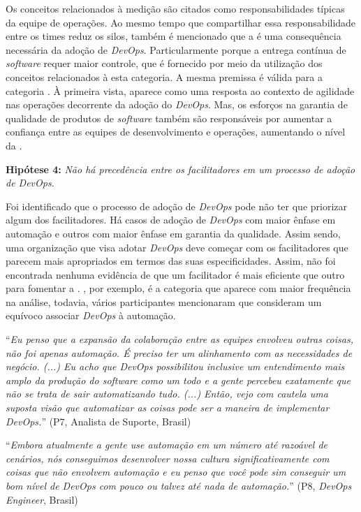 Os conceitos relacionados à medição são citados como responsabilidades típicas
da equipe de operações. Ao mesmo tempo que compartilhar essa responsabilidade
entre os times reduz os silos, também é mencionado que a 
é uma consequência necessária da adoção de {\it DevOps}. Particularmente porque a
entrega contínua de {\it software} requer maior controle, que é fornecido por
meio da utilização dos conceitos relacionados à esta categoria.
A mesma premissa é válida para a categoria .
À primeira vista,  aparece como uma resposta ao
contexto de agilidade nas operações decorrente da adoção do {\it DevOps}. Mas,
os esforços na garantia de qualidade de produtos de {\it software} também são
responsáveis por aumentar a confiança entre as equipes de desenvolvimento e
operações, aumentando o nível da \cc.

\begin{mh}
\textbf{Hipótese 4:} {\it Não há precedência entre os facilitadores em um
processo de adoção de DevOps}.
\end{mh}

Foi identificado que o processo de adoção de {\it DevOps} pode não ter que
priorizar algum dos facilitadores. Há casos de adoção de {\it DevOps} com maior
ênfase em automação e outros com maior ênfase em garantia da qualidade. Assim
sendo, uma organização que visa adotar {\it DevOps} deve começar com os
facilitadores que parecem mais apropriados em termos das suas especificidades.
Assim, não foi encontrada nenhuma evidência de que um facilitador é mais
eficiente que outro para fomentar a \cc. , por exemplo, é a
categoria que aparece com maior frequência na análise, todavia, vários
participantes mencionaram que consideram um equívoco associar {\it DevOps} à
automação.

\begin{mq}
``\emph{Eu penso que a expansão da colaboração entre as equipes envolveu outras
coisas, não foi apenas automação. É preciso ter um alinhamento com as
necessidades de negócio. (...) Eu acho que DevOps possibilitou inclusive um
entendimento mais amplo da produção do software como um todo e a gente percebeu
exatamente que não se trata de sair automatizando tudo. (...) Então, vejo com cautela uma
suposta visão que automatizar as coisas pode ser a maneira de implementar DevOps.}''
(P7, Analista de Suporte, Brasil)
\end{mq}

\begin{mq}
``\emph{Embora atualmente a gente use automação em um número até razoável de
cenários, nós conseguimos desenvolver nossa cultura significativamente com
coisas que não envolvem automação e eu penso que você pode sim conseguir um bom
nível de DevOps com pouco ou talvez até nada de automação.}'' (P8, {\it DevOps
Engineer}, Brasil)
\end{mq}

